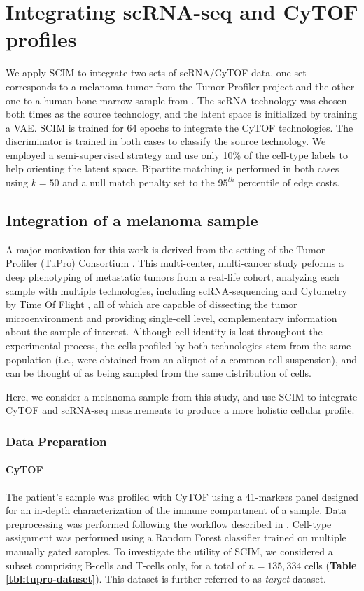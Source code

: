 \section{Integrating scRNA-seq and CyTOF profiles}


We apply SCIM to integrate two sets of scRNA/CyTOF data,
one set corresponds to a melanoma tumor from the Tumor Profiler project \cite{irmisch2020}
and the other one to a human bone marrow sample from \citet{oetjen2018}.
The scRNA technology was chosen both times as the source technology, and the latent space is initialized by training a VAE.
SCIM is trained for 64 epochs to integrate the CyTOF technologies.
The discriminator is trained in both cases to classify the source technology.
We employed a semi-supervised strategy and use only 10\% of the cell-type labels to help orienting the latent space.
Bipartite matching is performed in both cases using $k=50$ and a null match penalty set to the $95^{th}$ percentile of edge costs.


\subsection{Integration of a melanoma sample}
A major motivation for this work is derived from the setting of the Tumor Profiler (TuPro) Consortium \cite{irmisch2020}.
This multi-center, multi-cancer study peforms a deep phenotyping of metastatic tumors from a real-life cohort, 
analyzing each sample with multiple technologies, including scRNA-sequencing \cite{tang2009} and Cytometry by Time Of Flight \cite[CyTOF]{bandura2009},
all of which are capable of dissecting the tumor microenvironment and providing single-cell level, complementary information about the sample of interest.
Although cell identity is lost throughout the experimental process, the cells profiled by both technologies stem from the same population
(i.e., were obtained from an aliquot of a common cell suspension), and can be thought of as being sampled from the same distribution of cells.

Here, we consider a melanoma sample from this study, and use SCIM to integrate CyTOF and scRNA-seq measurements to produce a more holistic cellular profile.

\subsubsection{Data Preparation}
\paragraph{CyTOF}
The patient's sample was profiled with CyTOF using a 41-markers panel designed for an in-depth characterization of the immune compartment of a sample.
Data preprocessing was performed following the workflow described in \cite{chevrier2017, chevrier2018}.
Cell-type assignment was performed using a Random Forest classifier trained on multiple manually gated samples.
To investigate the utility of SCIM, we considered a subset comprising B-cells and T-cells only, for a total of $n{=}135,334$ cells (\textbf{Table \ref{tbl:tupro-dataset}}).
This dataset is further referred to as \textit{target} dataset.


